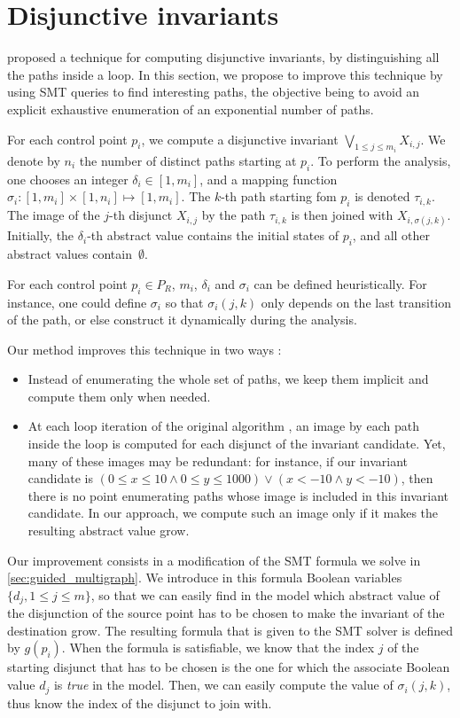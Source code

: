 \documentclass[preprint]{sigplanconf}
\begin{document}
\section{Disjunctive invariants}
\label{sec:disjunctive}

\citet{DBLP:conf/pldi/GulwaniZ10} proposed a technique for computing disjunctive invariants, by
distinguishing all the paths inside a loop. In
this section, we propose to improve this technique by using SMT queries to find
interesting paths, the objective being to avoid an explicit exhaustive
enumeration of an exponential number of paths.

For each control point $p_i$, we compute a disjunctive invariant
$\bigvee_{1\leq j \leq m_i} X_{i,j}$. We denote by $n_i$ the number of
distinct paths starting at $p_i$.
To perform the analysis, one chooses an integer $\delta_i \in [1,m_i]$, and
a mapping function $\sigma_i: [1,m_i] \times [1,n_i] \mapsto [1,m_i]$.
  The $k$-th path starting fom $p_i$ is denoted $\tau_{i,k}$.
  The image of the $j$-th disjunct $X_{i,j}$ by the path $\tau_{i,k}$ is then
  joined with $X_{i,\sigma(j,k)}$.
Initially, the $\delta_i$-th abstract value contains the initial states of
$p_i$, and all other abstract values contain~$\emptyset$.

For each control point $p_i \in P_R$, $m_i$, $\delta_i$ and $\sigma_i$ can be defined heuristically.
For instance, one could define $\sigma_i$ so that $\sigma_i(j,k)$ only depends on the
last transition of the path, or else construct it dynamically during the
analysis.

Our method improves this technique in two ways :
\begin{itemize}
\item Instead of enumerating the whole set of paths, we keep them implicit and
compute them only when needed.

\item At each loop iteration of the original algorithm \citep{DBLP:conf/pldi/GulwaniZ10}, an image by each path inside the loop is computed for each disjunct of the invariant candidate.
Yet, many of these images may be redundant: for instance, if our invariant candidate is $(0 \leq x \leq 10 \land 0 \leq y \leq 1000) \lor (x < -10 \land y < -10)$, then there is no point enumerating paths whose image is included in this invariant candidate.
In our approach, we compute such an image only if it makes the resulting abstract value grow.
\end{itemize}

Our improvement consists in a modification of the SMT formula we solve in
\ref{sec:guided_multigraph}.
We introduce in this formula Boolean variables $\{d_j, 1 \leq j \leq m\}$, so
that we can easily find in the model which abstract value of the
disjunction of the source point has
to be chosen to make the invariant of the destination grow.
The resulting formula that is given to the SMT solver is defined
by $g(p_i)$.
When the formula is satisfiable, we know that the index $j$ of the starting
disjunct that has to be chosen is the one for which the associate Boolean value
$d_j$ is \emph{true} in the model. Then, we can easily compute the value of 
$\sigma_i(j,k)$, thus know the index of the disjunct to join with.
\end{document}

